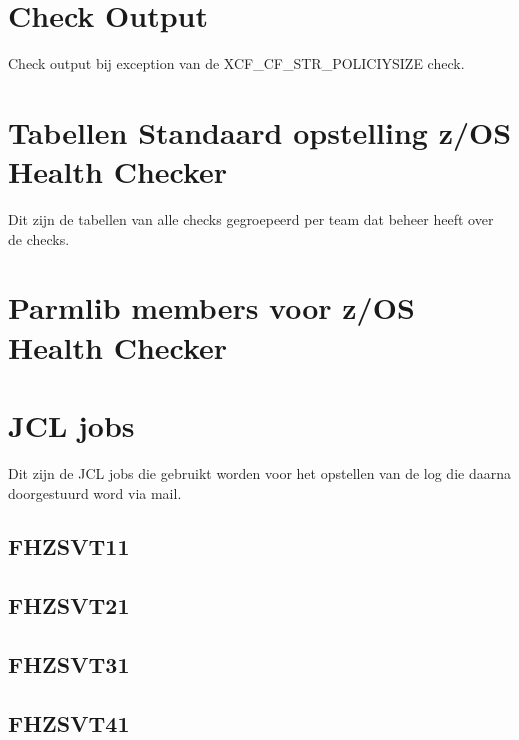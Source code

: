 \section{Check Output}
\label{sec:Check Output}

Check output bij exception van de XCF\_CF\_STR\_POLICIYSIZE check.



\section{Tabellen Standaard opstelling z/OS Health Checker}
\label{sec:Tabellen Standaard opstelling z/OS Health Checker}

Dit zijn de tabellen van alle checks gegroepeerd per team dat beheer heeft over de checks.



\section{Parmlib members voor z/OS Health Checker}
\label{sec:Parmlin members voor z/OS Health Checker}



\section{JCL jobs}
\label{sec:JCL jobs}

Dit zijn de JCL jobs die gebruikt worden voor het opstellen van de log die daarna doorgestuurd word via mail.

\subsection{FHZSVT11}
\label{subsec:FHZSVT11}



\subsection{FHZSVT21}
\label{subsec:FHZSVT21}



\subsection{FHZSVT31}
\label{subsec:FHZSVT31}



\subsection{FHZSVT41}
\label{subsec:FHZSVT41}

